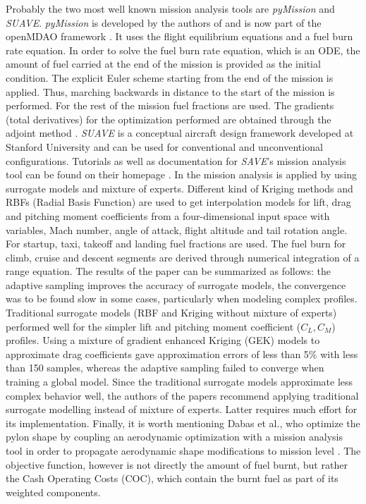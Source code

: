 Probably the two most well known mission analysis tools 
are \emph{pyMission} and \emph{SUAVE}. 
\emph{pyMission} is developed by the authors of 
\cite{kao_modular_2015}
and is now part of the openMDAO framework \cite{gray_openmdao_2019}. It 
uses the flight equilibrium equations and a fuel 
burn rate equation. In order to solve the fuel
burn rate equation, which is an ODE, the amount 
of fuel carried at the end of the mission 
is provided as the initial condition. The explicit Euler 
scheme starting from the end of the mission is applied. 
Thus, marching backwards in distance to the start 
of the mission is performed. For the rest of the mission 
fuel fractions are used. The gradients 
(total derivatives) for 
the optimization performed are obtained 
through the adjoint method \cite{martins_review_2013}. 
\emph{SUAVE} is a conceptual 
aircraft design framework developed at  
Stanford University and can be used for conventional 
and unconventional configurations. Tutorials as well 
as documentation for \emph{SAVE}'s mission analysis tool 
can be found on their 
homepage \cite{noauthor_homepage_2021}. 
In \cite{liem_multimission_2015, liem_aerostructural_2013,
liem_surrogate_2015} the mission analysis 
is applied by using surrogate models and mixture 
of experts. Different kind 
of Kriging methods and RBFs (Radial Basis Function) are used 
to get interpolation models for lift, drag and pitching 
moment coefficients from a four-dimensional input space with 
variables, Mach number, angle of attack, flight 
altitude and tail rotation angle. For startup, taxi, takeoff 
and landing fuel fractions are used. The fuel burn for 
climb, cruise and descent segments are derived through 
numerical integration of a range equation. 
The results of the paper can be summarized as follows: 
the adaptive sampling improves the accuracy of surrogate models, 
the convergence was to be found slow in some cases, particularly when modeling 
complex profiles. Traditional 
surrogate models (RBF and Kriging without mixture of experts)
performed well for the simpler 
lift and pitching moment coefficient ($C_L, C_M$)
profiles. Using a mixture of gradient enhanced Kriging (GEK)
models to approximate drag
coefficients gave approximation errors of less than 
5\% with less than 150 samples, whereas the adaptive sampling
failed to converge when training a global model. Since 
the traditional surrogate models approximate 
less complex behavior well, the authors of 
the papers recommend applying traditional 
surrogate modelling instead of mixture 
of experts. Latter requires much effort 
for its implementation.
Finally, it is worth mentioning Dabas et al., who optimize
the pylon shape by coupling an aerodynamic
optimization with a mission
analysis tool in order to propagate aerodynamic 
shape modifications to mission level \cite{dabas_error-based_2019}. The objective 
function, however is not directly the 
amount of fuel burnt, but rather the Cash Operating Costs (COC),
which contain the burnt fuel as part of its weighted components.
